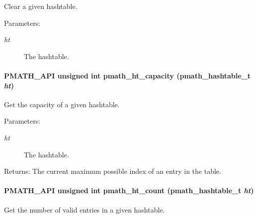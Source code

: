 Clear a given hashtable. 

\begin{Desc}
\item[Parameters:]
\begin{description}
\item[{\em ht}]The hashtable. \end{description}
\end{Desc}
\hypertarget{group__hashtables_gc3bb123d747694b6144b8561efb15feb}{
\paragraph[{pmath\_\-ht\_\-capacity}]{\setlength{\rightskip}{0pt plus 5cm}PMATH\_\-API unsigned int pmath\_\-ht\_\-capacity ({\bf pmath\_\-hashtable\_\-t} {\em ht})}\hfill}
\label{group__hashtables_gc3bb123d747694b6144b8561efb15feb}


Get the capacity of a given hashtable. 

\begin{Desc}
\item[Parameters:]
\begin{description}
\item[{\em ht}]The hashtable. \end{description}
\end{Desc}
\begin{Desc}
\item[Returns:]The current maximum possible index of an entry in the table. \end{Desc}
\hypertarget{group__hashtables_gf42cb622735f861185f056de654d3632}{
\paragraph[{pmath\_\-ht\_\-count}]{\setlength{\rightskip}{0pt plus 5cm}PMATH\_\-API unsigned int pmath\_\-ht\_\-count ({\bf pmath\_\-hashtable\_\-t} {\em ht})}\hfill}
\label{group__hashtables_gf42cb622735f861185f056de654d3632}


Get the number of valid entries in a given hashtable. 

